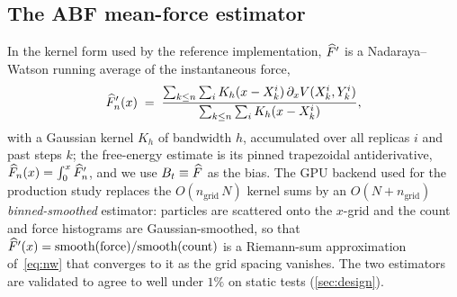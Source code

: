 \subsection{The ABF mean-force estimator}
\label{sec:abf_estimator}
In the kernel form used by the reference implementation, $\widehat{F}'$ is a
Nadaraya--Watson running average of the instantaneous force,
\begin{equation}
  \widehat{F}'_n(x) \;=\;
  \frac{\sum_{k\le n}\sum_i K_h(x-X_k^i)\,\partial_x V(X_k^i,Y_k^i)}
       {\sum_{k\le n}\sum_i K_h(x-X_k^i)},
  \label{eq:nw}
\end{equation}
with a Gaussian kernel $K_h$ of bandwidth $h$, accumulated over all replicas
$i$ and past steps $k$; the free-energy estimate is its pinned trapezoidal
antiderivative, $\widehat{F}_n(x)=\int_0^x\widehat{F}'_n$, and we use $B_t\equiv\widehat{F}$ as
the bias. The GPU backend used for the production study replaces the
$O(n_{\mathrm{grid}}\,N)$ kernel sums by an $O(N+n_{\mathrm{grid}})$
\emph{binned-smoothed} estimator: particles are scattered onto the $x$-grid and
the count and force histograms are Gaussian-smoothed, so that
$\widehat{F}'(x)=\mathrm{smooth(force)}/\mathrm{smooth(count)}$ is a Riemann-sum
approximation of~\eqref{eq:nw} that converges to it as the grid spacing
vanishes. The two estimators are validated to agree to well under $1\%$ on
static tests (\cref{sec:design}).
